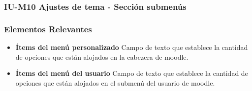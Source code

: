 


\subsubsection{IU-M10 Ajustes de tema - Sección submenús}



\subsubsection{Elementos Relevantes}

    \begin{itemize}
        \item {\bf Ítems del menú personalizado}
            Campo de texto que establece la cantidad de opciones que están alojados en la cabezera de moodle.
        \item {\bf Ítems del menú del usuario}
            Campo de texto que establece la cantidad de opciones que están alojados en el submenú del usuario de moodle.
    \end{itemize}


\clearpage
